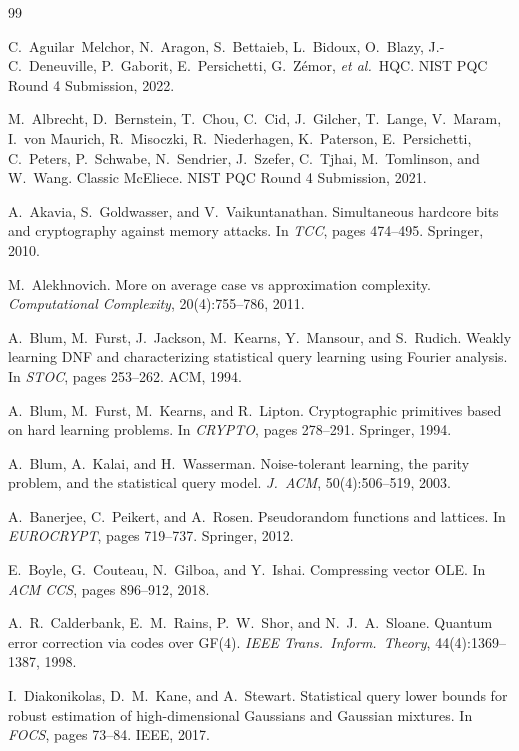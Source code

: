\documentclass[11pt,a4paper]{article}
\theoremstyle{plain}
\theoremstyle{definition}
\newcommand{\etal}{\textit{et al.}}
\begin{document}
\begin{thebibliography}{99}

C.~Aguilar~Melchor, N.~Aragon, S.~Bettaieb, L.~Bidoux, O.~Blazy, J.-C.~Deneuville, P.~Gaborit, E.~Persichetti, G.~Z\'emor, \etal\
HQC.
NIST PQC Round 4 Submission, 2022.

M.~Albrecht, D.~Bernstein, T.~Chou, C.~Cid, J.~Gilcher, T.~Lange, V.~Maram, I.~von Maurich, R.~Misoczki, R.~Niederhagen, K.~Paterson, E.~Persichetti, C.~Peters, P.~Schwabe, N.~Sendrier, J.~Szefer, C.~Tjhai, M.~Tomlinson, and W.~Wang.
Classic McEliece.
NIST PQC Round 4 Submission, 2021.

A.~Akavia, S.~Goldwasser, and V.~Vaikuntanathan.
Simultaneous hardcore bits and cryptography against memory attacks.
In \emph{TCC}, pages 474--495. Springer, 2010.

M.~Alekhnovich.
More on average case vs approximation complexity.
\emph{Computational Complexity}, 20(4):755--786, 2011.

A.~Blum, M.~Furst, J.~Jackson, M.~Kearns, Y.~Mansour, and S.~Rudich.
Weakly learning DNF and characterizing statistical query learning using Fourier analysis.
In \emph{STOC}, pages 253--262. ACM, 1994.

A.~Blum, M.~Furst, M.~Kearns, and R.~Lipton.
Cryptographic primitives based on hard learning problems.
In \emph{CRYPTO}, pages 278--291. Springer, 1994.

A.~Blum, A.~Kalai, and H.~Wasserman.
Noise-tolerant learning, the parity problem, and the statistical query model.
\emph{J.\ ACM}, 50(4):506--519, 2003.

A.~Banerjee, C.~Peikert, and A.~Rosen.
Pseudorandom functions and lattices.
In \emph{EUROCRYPT}, pages 719--737. Springer, 2012.

E.~Boyle, G.~Couteau, N.~Gilboa, and Y.~Ishai.
Compressing vector OLE.
In \emph{ACM CCS}, pages 896--912, 2018.

A.~R.~Calderbank, E.~M.~Rains, P.~W.~Shor, and N.~J.~A.~Sloane.
Quantum error correction via codes over GF(4).
\emph{IEEE Trans.\ Inform.\ Theory}, 44(4):1369--1387, 1998.

I.~Diakonikolas, D.~M.~Kane, and A.~Stewart.
Statistical query lower bounds for robust estimation of high-dimensional Gaussians and Gaussian mixtures.
In \emph{FOCS}, pages 73--84. IEEE, 2017.


\end{thebibliography}
\end{document}
